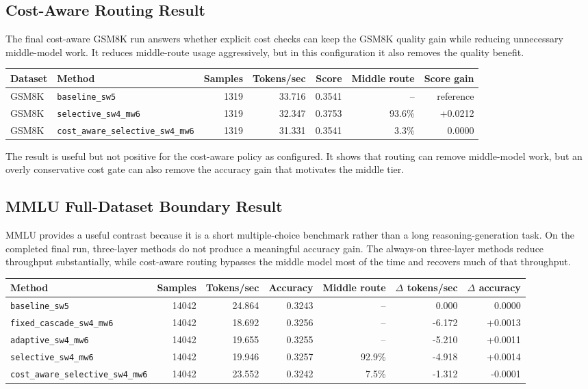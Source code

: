 \documentclass[11pt]{article}
\begin{document}
\subsection{Cost-Aware Routing Result}

The final cost-aware GSM8K run answers whether explicit cost checks can keep the GSM8K quality gain while reducing unnecessary middle-model work. It reduces middle-route usage aggressively, but in this configuration it also removes the quality benefit.

\begin{center}
\begin{tabular}{llrrrrr}
\toprule
Dataset & Method & Samples & Tokens/sec & Score & Middle route & Score gain \\
\midrule
GSM8K & \texttt{baseline\_sw5} & 1319 & 33.716 & 0.3541 & -- & reference \\
GSM8K & \texttt{selective\_sw4\_mw6} & 1319 & 32.347 & 0.3753 & 93.6\% & +0.0212 \\
GSM8K & \texttt{cost\_aware\_selective\_sw4\_mw6} & 1319 & 31.331 & 0.3541 & 3.3\% & 0.0000 \\
\bottomrule
\end{tabular}
\end{center}

The result is useful but not positive for the cost-aware policy as configured. It shows that routing can remove middle-model work, but an overly conservative cost gate can also remove the accuracy gain that motivates the middle tier.

\subsection{MMLU Full-Dataset Boundary Result}

MMLU provides a useful contrast because it is a short multiple-choice benchmark rather than a long reasoning-generation task. On the completed final run, three-layer methods do not produce a meaningful accuracy gain. The always-on three-layer methods reduce throughput substantially, while cost-aware routing bypasses the middle model most of the time and recovers much of that throughput.

\begin{center}
\begin{tabular}{lrrrrrr}
\toprule
Method & Samples & Tokens/sec & Accuracy & Middle route & $\Delta$ tokens/sec & $\Delta$ accuracy \\
\midrule
\texttt{baseline\_sw5} & 14042 & 24.864 & 0.3243 & -- & 0.000 & 0.0000 \\
\texttt{fixed\_cascade\_sw4\_mw6} & 14042 & 18.692 & 0.3256 & -- & -6.172 & +0.0013 \\
\texttt{adaptive\_sw4\_mw6} & 14042 & 19.655 & 0.3255 & -- & -5.210 & +0.0011 \\
\texttt{selective\_sw4\_mw6} & 14042 & 19.946 & 0.3257 & 92.9\% & -4.918 & +0.0014 \\
\texttt{cost\_aware\_selective\_sw4\_mw6} & 14042 & 23.552 & 0.3242 & 7.5\% & -1.312 & -0.0001 \\
\bottomrule
\end{tabular}
\end{center}
\end{document}
